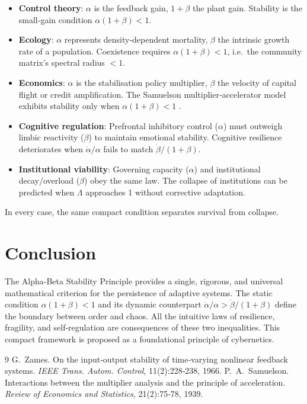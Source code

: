 \documentclass[11pt]{article}
\begin{document}
\begin{itemize}
\item \textbf{Control theory}: $\alpha$ is the feedback gain, $1+\beta$ the plant gain.  Stability is the small‑gain condition $\alpha(1+\beta)<1$.
\item \textbf{Ecology}: $\alpha$ represents density‑dependent mortality, $\beta$ the intrinsic growth rate of a population.  Coexistence requires $\alpha(1+\beta)<1$, i.e.\ the community matrix's spectral radius $<1$.
\item \textbf{Economics}: $\alpha$ is the stabilisation policy multiplier, $\beta$ the velocity of capital flight or credit amplification.  The Samuelson multiplier‑accelerator model exhibits stability only when $\alpha(1+\beta)<1$ \cite{samuelson1939}.
\item \textbf{Cognitive regulation}: Prefrontal inhibitory control ($\alpha$) must outweigh limbic reactivity ($\beta$) to maintain emotional stability.  Cognitive resilience deteriorates when $\dot\alpha/\alpha$ fails to match $\dot\beta/(1+\beta)$.
\item \textbf{Institutional viability}: Governing capacity ($\alpha$) and institutional decay/overload ($\beta$) obey the same law.  The collapse of institutions can be predicted when $\Lambda$ approaches 1 without corrective adaptation.
\end{itemize}

In every case, the same compact condition separates survival from collapse.

\section{Conclusion}
The Alpha‑Beta Stability Principle provides a single, rigorous, and universal mathematical criterion for the persistence of adaptive systems.  The static condition $\alpha(1+\beta)<1$ and its dynamic counterpart $\dot\alpha/\alpha > \dot\beta/(1+\beta)$ define the boundary between order and chaos.  All the intuitive laws of resilience, fragility, and self‑regulation are consequences of these two inequalities.  This compact framework is proposed as a foundational principle of cybernetics.

\begin{thebibliography}{9}
G.~Zames.
\newblock On the input‑output stability of time‑varying nonlinear feedback systems.
\newblock \emph{IEEE Trans. Autom. Control}, 11(2):228‑238, 1966.
P.~A.~Samuelson.
\newblock Interactions between the multiplier analysis and the principle of acceleration.
\newblock \emph{Review of Economics and Statistics}, 21(2):75‑78, 1939.
\end{thebibliography}
\end{document}

